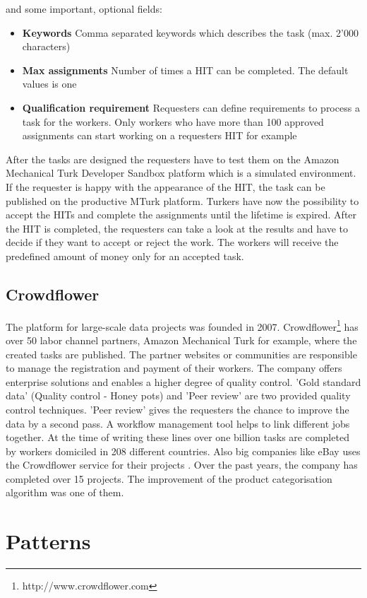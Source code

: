 and some important, optional fields: 
\begin{itemize}
	\item \textbf{Keywords} Comma separated keywords which describes the task (max. 2'000 characters) 
	\item \textbf{Max assignments} Number of times a HIT can be completed. The default values is one 
	\item \textbf{Qualification requirement} Requesters can define requirements to process a task for the workers. Only workers who have more than 100 approved assignments can start working on a requesters HIT for example 
\end{itemize}
After the tasks are designed the requesters have to test them on the Amazon Mechanical Turk Developer Sandbox platform which is a simulated environment. If the requester is happy with the appearance of the HIT, the task can be published on the productive MTurk platform. Turkers have now the possibility to accept the HITs and complete the assignments until the lifetime is expired. After the HIT is completed, the requesters can take a look at the results and have to decide if they want to accept or reject the work. The workers will receive the predefined amount of money only for an accepted task. 

\subsection{Crowdflower}
The platform for large-scale data projects was founded in 2007. Crowdflower\footnote{http://www.crowdflower.com} has over 50 labor channel partners, Amazon Mechanical Turk for example, where the created tasks are published. The partner websites or communities are responsible to manage the registration and payment of their workers. The company offers enterprise solutions and enables a higher degree of quality control. 'Gold standard data' (Quality control - Honey pots) and 'Peer review' are two provided quality control techniques. 'Peer review' gives the requesters the chance to improve the data by a second pass. A workflow management tool helps to link different jobs together. At the time of writing these lines over one billion tasks are completed by workers domiciled in 208 different countries. Also big companies like eBay uses the Crowdflower service for their projects \cite{crowdflower_casestudy}. Over the past years, the company has completed over 15 projects. The improvement of the product categorisation algorithm was one of them.
\section{Patterns}


